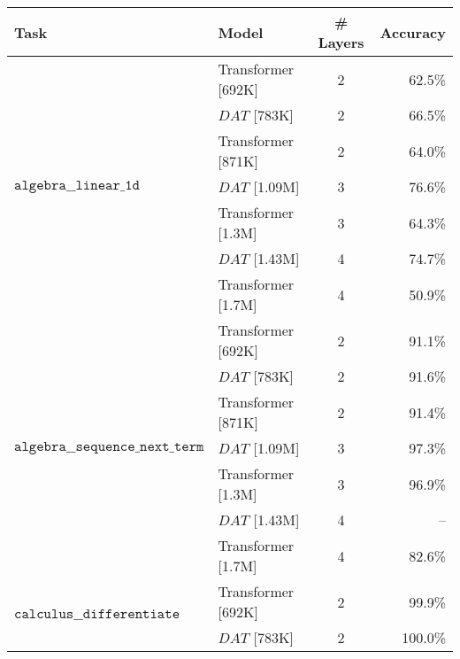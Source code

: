 \begin{tabular}{l|l|c|r}
    \toprule
    Task                                                      & Model                & \# Layers & Accuracy \\
    \midrule
    \multirow{7}{*}{$\texttt{algebra\_\_linear\_1d}$}         & Transformer [692K]   & 2         & 62.5\%   \\
                                                              & $DAT$ [783K]         & 2         & 66.5\%   \\
                                                              & Transformer [871K]   & 2         & 64.0\%   \\
                                                              & $DAT$ [1.09M]        & 3         & 76.6\%   \\
                                                              & Transformer [1.3M]   & 3         & 64.3\%   \\
                                                              & $DAT$ [1.43M]        & 4         & 74.7\%   \\
                                                              & Transformer [1.7M]   & 4         & 50.9\%   \\
    \cline{1-4}
    \multirow{7}{*}{$\texttt{algebra\_\_sequence\_next\_term}$} & Transformer [692K] & 2         & 91.1\%   \\
                                                              & $DAT$ [783K]         & 2         & 91.6\%   \\
                                                              & Transformer [871K]   & 2         & 91.4\%   \\
                                                              & $DAT$ [1.09M]        & 3         & 97.3\%   \\
                                                              & Transformer [1.3M]   & 3         & 96.9\%   \\
                                                              & $DAT$ [1.43M]        & 4         & --       \\
                                                              & Transformer [1.7M]   & 4         & 82.6\%   \\
    \cline{1-4}
    \multirow{7}{*}{$\texttt{calculus\_\_differentiate}$}     & Transformer [692K]   & 2         & 99.9\%   \\
                                                              & $DAT$ [783K]         & 2         & 100.0\%  \\

\end{tabular}
